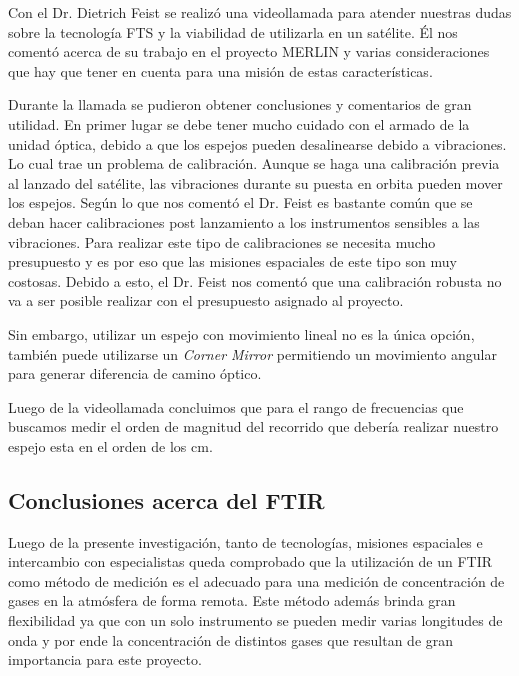 \documentclass[11pt,titlepage]{article}
\begin{document}
Con el Dr. Dietrich Feist se realizó una videollamada para atender nuestras dudas sobre la tecnología FTS y la viabilidad de utilizarla en un satélite. Él nos comentó acerca de su trabajo en el proyecto MERLIN y varias consideraciones que hay que tener en cuenta para una misión de estas características.\par
Durante la llamada se pudieron obtener conclusiones y comentarios de gran utilidad. En primer lugar se debe tener mucho cuidado con el armado de la unidad óptica, debido a que los espejos pueden desalinearse debido a vibraciones. Lo cual trae un problema de calibración. Aunque se haga una calibración previa al lanzado del satélite, las vibraciones durante su puesta en orbita pueden mover los espejos. Según lo que nos comentó el Dr. Feist es bastante común que se deban hacer calibraciones post lanzamiento a los instrumentos sensibles a las vibraciones. Para realizar este tipo de calibraciones se necesita mucho presupuesto y es por eso que las misiones espaciales de este tipo son muy costosas. Debido a esto, el Dr. Feist nos comentó que una calibración robusta no va a ser posible realizar con el presupuesto asignado al proyecto.\par
Sin embargo, utilizar un espejo con movimiento lineal no es la única opción, también puede utilizarse un \textit{Corner Mirror} permitiendo un movimiento angular para generar diferencia de camino óptico. \par
Luego de la videollamada concluimos que para el rango de frecuencias que buscamos medir el orden de magnitud del recorrido que debería realizar nuestro espejo esta en el orden de los cm.


\subsection{Conclusiones acerca del FTIR}

Luego de la presente investigación, tanto de tecnologías, misiones espaciales e intercambio con especialistas queda comprobado que la utilización de un FTIR como método de medición es el adecuado para una medición de concentración de gases en la atmósfera de forma remota. Este método además brinda gran flexibilidad ya que con un solo instrumento se pueden medir varias longitudes de onda y por ende la concentración de distintos gases que resultan de gran importancia para este proyecto.

\end{document}
